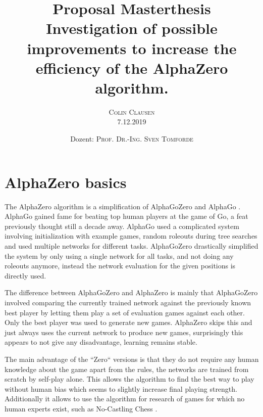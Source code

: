 \documentclass[12pt,onecolumn,oneside,titlepage]{article}
\begin{document}
\title{\bfseries {\Large Proposal Masterthesis}\\[2cm]
      Investigation of possible improvements to increase the efficiency of the AlphaZero algorithm.}

\author{\textsc{Colin Clausen}\\[1cm]
        7.12.2019\\[3cm]}

\date{Dozent: \textsc{Prof. Dr.-Ing. Sven Tomforde}}


\maketitle
\setcounter{tocdepth}{3}  %
\tableofcontents
\newpage

\section{AlphaZero basics}

The AlphaZero algorithm \cite{silver2018general} is a simplification of AlphaGoZero \cite{silver2017mastering} and AlphaGo \cite{silver2016mastering}. AlphaGo gained fame for beating top human players at the game of Go, a feat previously thought still a decade away.
AlphaGo used a complicated system involving initialization with example games, random roleouts during tree searches and used multiple networks for different tasks. AlphaGoZero drastically simplified the system by only using a single network for all tasks,
and not doing any roleouts anymore, instead the network evaluation for the given positions is directly used.

The difference between AlphaGoZero and AlphaZero is mainly that AlphaGoZero involved comparing the currently trained network against the previously known best player by letting them play a set of evaluation games against each other.
Only the best player was used to generate new games. AlphaZero skips this and just always uses the current network to produce new games, surprisingly this appears to not give any disadvantage, learning remains stable.

The main advantage of the ``Zero`` versions is that they do not require any human knowledge about the game apart from the rules, the networks are trained from scratch by self-play alone.
This allows the algorithm to find the best way to play without human bias which seems to slightly increase final playing strength.
Additionally it allows to use the algorithm for research of games for which no human experts exist, such as No-Castling Chess \cite{NoCastleChess}.
\end{document}
